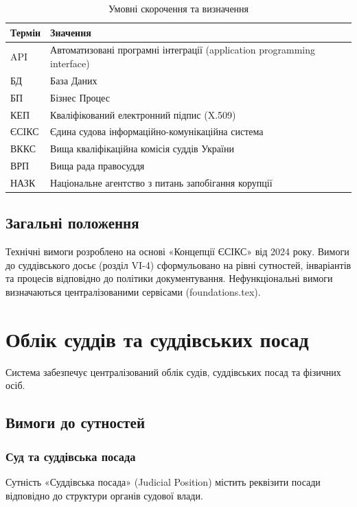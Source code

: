 \documentclass{article}
\begin{document}
\begin{table}[ht]
\caption{Умовні скорочення та визначення}
\begin{tabular}{p{4cm}p{10cm}}
\hline
\textbf{Термін} & \textbf{Значення} \\
\hline
API & Автоматизовані програмні інтеграції (application programming interface) \\
БД & База Даних \\
БП & Бізнес Процес \\
КЕП & Кваліфікований електронний підпис (X.509) \\
ЄСІКС & Єдина судова інформаційно-комунікаційна система \\
ВККС & Вища кваліфікаційна комісія суддів України \\
ВРП & Вища рада правосуддя \\
НАЗК & Національне агентство з питань запобігання корупції \\
\hline
\end{tabular}
\end{table}

\subsection*{Загальні положення}

Технічні вимоги розроблено на основі «Концепції ЄСІКС» від 2024 року. Вимоги до суддівського досьє (розділ VI-4) сформульовано на рівні сутностей, інваріантів та процесів відповідно до політики документування. Нефункціональні вимоги визначаються централізованими сервісами (foundations.tex).

\newpage
\section{Облік суддів та суддівських посад}

Система забезпечує централізований облік судів, суддівських посад та фізичних осіб.

\subsection{Вимоги до сутностей}

\subsubsection{Суд та суддівська посада}
Сутність «Суддівська посада» (Judicial Position) містить реквізити посади відповідно до структури органів судової влади.
\end{document}

